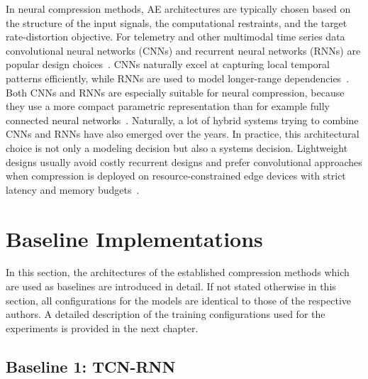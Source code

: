 In neural compression methods, AE architectures are typically chosen based on the structure of the input signals, the computational restraints, and the target rate-distortion objective. For telemetry and other multimodal time series data convolutional neural networks (CNNs) and recurrent neural networks (RNNs) are popular design choices~\cite[pp.146--148]{Yang2022}. CNNs naturally excel at capturing local temporal patterns efficiently, while RNNs are used to model longer-range dependencies~\cite[pp.146--148]{Yang2022}. Both CNNs and RNNs are especially suitable for neural compression, because they use a more compact parametric representation than for example fully connected neural networks~\cite{Du2019}. Naturally, a lot of hybrid systems trying to combine CNNs and RNNs have also emerged over the years. In practice, this architectural choice is not only a modeling decision but also a systems decision. Lightweight designs usually avoid costly recurrent designs and prefer convolutional approaches when compression is deployed on resource-constrained edge devices with strict latency and memory budgets~\cite{Hodo2025, Johnston2019}. 

\section{Baseline Implementations}

In this section, the architectures of the established compression methods which are used as baselines are introduced in detail. If not stated otherwise in this section, all configurations for the models are identical to those of the respective authors. A detailed description of the training configurations used for the experiments is provided in the next chapter.

\subsection{Baseline 1: TCN-RNN}


